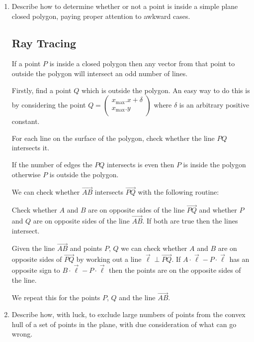 \documentclass[10pt,\jkfside,a4paper]{article}
\begin{document}
\begin{enumerate}

\item Describe how to determine whether or not a point is inside a simple plane 
closed polygon, paying proper attention to awkward cases.

\subsection{Ray Tracing}

If a point $P$ is inside a closed polygon then any vector from that point to 
outside the polygon will intersect an odd number of lines.

Firstly, find a point $Q$ which is outside the polygon. An easy way to do this is 
by considering the point $Q = \begin{pmatrix} x_{\text{max}}.x + \delta \\ 
x_{\text{max}}.y \\ \end{pmatrix}$ where $\delta$ is an arbitrary positive 
constant.

For each line on the surface of the polygon, check whether the line $PQ$ intersects it. 

If the number of edges the $PQ$ intersects is even then $P$ is inside the polygon 
otherwise $P$ is outside the polygon.

\vspace{0.1cm}

We can check whether $\overrightarrow{AB}$ intersects $\overrightarrow{PQ}$ with the following routine:

Check whether $A$ and $B$ are on opposite sides of the line $\overrightarrow{PQ}$ and 
whether $P$ and $Q$ are on opposite sides of the line $\overrightarrow{AB}$. If both are 
true then the lines intersect.

Given the line $\overrightarrow{AB}$ and points $P$, $Q$ we can check whether $A$ and $B$ are on 
opposite sides of $\overrightarrow{PQ}$ by working out a line $\overrightarrow{\ell} \perp \overrightarrow{PQ}$. 
If $A\cdot \overrightarrow{\ell} - P\cdot \overrightarrow{\ell}$ has an opposite sign to $B\cdot \overrightarrow{\ell} - P \cdot \overrightarrow{\ell}$ 
then the points are on the opposite sides of the line. 

We repeat this for the points $P$, $Q$ and the line $\overrightarrow{AB}$.

\item Describe how, with luck, to exclude large numbers of points from the convex hull 
of a set of points in the plane, with due consideration of what can go wrong.


\end{enumerate}
\end{document}

